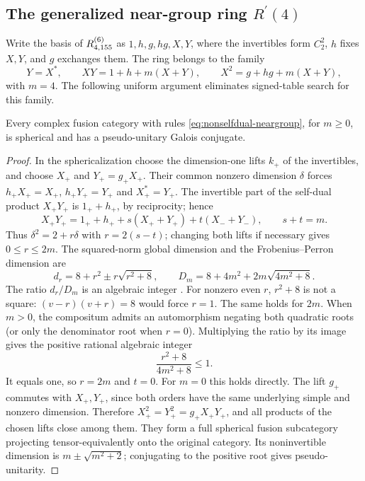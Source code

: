 \subsection{The generalized near-group ring $R^\prime(4)$}
\label{sec:frontier-155}
Write the basis of $R^{(6)}_{4,155}$ as $1,h,g,hg,X,Y$, where the
invertibles form $C_2^2$, $h$ fixes $X,Y$, and $g$ exchanges them.
The ring belongs to the family
\begin{equation}\label{eq:nonselfdual-neargroup}
 Y=X^*,\qquad XY=1+h+m(X+Y),\qquad X^2=g+hg+m(X+Y),
\end{equation}
with $m=4$. The following uniform argument eliminates signed-table
search for this family.

\begin{proposition}\label{prop:nonselfdual-neargroup-spherical}
Every complex fusion category with rules
\eqref{eq:nonselfdual-neargroup}, for $m\ge0$, is spherical and has a
pseudo-unitary Galois conjugate.
\end{proposition}
\begin{proof}
In the sphericalization choose the dimension-one lifts $k_+$ of the
invertibles, and choose $X_+$ and $Y_+=g_+X_+$. Their common nonzero
dimension $\delta$ forces
$h_+X_+=X_+$, $h_+Y_+=Y_+$ and $X_+^*=Y_+$.
The invertible part of the self-dual product $X_+Y_+$ is $1_++h_+$,
by reciprocity; hence
\[
 X_+Y_+=1_++h_++s(X_++Y_+)+t(X_-+Y_-),\qquad s+t=m.
\]
Thus $\delta^2=2+r\delta$ with $r=2(s-t)$; changing both lifts if
necessary gives $0\le r\le2m$. The squared-norm global dimension and
the Frobenius--Perron dimension are
\[
 d_r=8+r^2\pm r\sqrt{r^2+8},\qquad
 D_m=8+4m^2+2m\sqrt{4m^2+8}.
\]
The ratio $d_r/D_m$ is an algebraic integer
\cite[Proposition~8.22]{ENO}. For nonzero even $r$, $r^2+8$ is not a
square: $(v-r)(v+r)=8$ would force $r=1$. The same holds for $2m$.
When $m>0$, the compositum admits an automorphism negating both
quadratic roots (or only the denominator root when $r=0$).
Multiplying the ratio by its image gives the positive rational
algebraic integer
\[
 \frac{r^2+8}{4m^2+8}\le1.
\]
It equals one, so $r=2m$ and $t=0$. For $m=0$ this holds directly.
The lift $g_+$ commutes with $X_+,Y_+$, since both orders have the same
underlying simple and nonzero dimension. Therefore
$X_+^2=Y_+^2=g_+X_+Y_+$, and all products of the chosen lifts close
among them. They form a full spherical fusion subcategory projecting
tensor-equivalently onto the original category. Its noninvertible
dimension is $m\pm\sqrt{m^2+2}$; conjugating to the positive root
gives pseudo-unitarity.
\end{proof}

